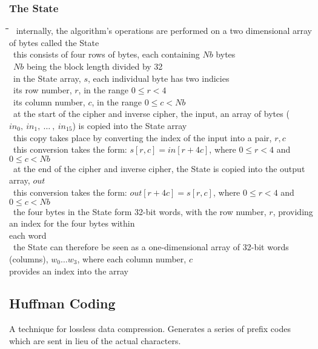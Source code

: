 \documentclass[10pt,letterpaper]{scrartcl}
\newcommand{\tbul}{\textbullet}
\newcommand{\tend}{\>\textendash}
\newcommand{\tasc}{\>\>\textasteriskcentered}
\newcommand{\tabDef}{\hspace{2em}\=\hspace{2em}\=\hspace{2em}\=\hspace{2em}\=\kill}
\begin{document}
\subsubsection*{The State}\begin{tabbing}\tabDef
\tbul\ internally, the algorithm's operations are performed on a two dimensional array of bytes called the State \\
\tbul\ this consists of four rows of bytes, each containing $Nb$ bytes \\
    \tend\ $Nb$ being the block length divided by 32 \\
\tbul\ in the State array, $s$, each individual byte has two indicies \\
    \tend\ its row number, $r$, in the range $0\leq r < 4$ \\
    \tend\ its column number, $c$, in the range $0\leq c < Nb$\\
\tbul\ at the start of the cipher and inverse cipher, the input, an array of bytes ($in_0,\ in_1,\ \ldots\ ,\ in_{15}$) is copied into the State array \\
    \tend\ this copy takes place by converting the index of the input into a pair, $r,c$ \\
        \tasc\ this conversion takes the form: $s[r,c]=in[r+4c]$, where $0\leq r < 4$ and $0\leq c < Nb$\\
    \tend\ at the end of the cipher and inverse cipher, the State is copied into the output array, $out$ \\
        \tasc\ this conversion takes the form: $out[r+4c]=s[r,c]$, where $0\leq r < 4$ and $0\leq c < Nb$ \\
\tbul\ the four bytes in the State form 32-bit words, with the row number, $r$, providing an index for the four bytes within\\ each word \\
\tbul\ the State can therefore be seen as a one-dimensional array of 32-bit words (columns), $w_0\ldots w_3$, where each column number, $c$\\ provides an index into the array \\

\end{tabbing}

\subsection{Huffman Coding}
A technique for lossless data compression. Generates a series of prefix codes which are sent in lieu of the actual characters. 
\end{document}
